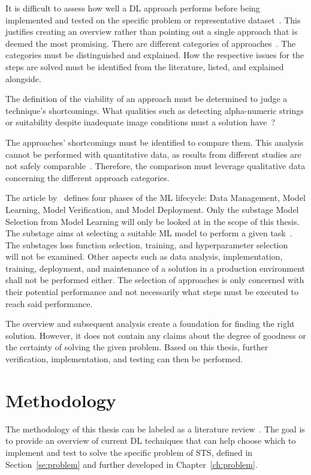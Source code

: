 It is difficult to assess how well a \ac{DL} approach performs before being implemented and tested
on the specific problem or representative dataset~\citep{arpteg_software_2018}.
This justifies creating an overview rather than pointing out a single approach that is
deemed the most promising.
There are different categories of approaches~\citep{chen_text_2021,long_scene_2021}.
The categories must be distinguished and explained.
How the respective issues for the steps are solved must be
identified from the literature, listed, and explained alongside.

The definition of the viability of an approach must be determined to judge a technique's shortcomings.
What qualities such as detecting alpha-numeric strings or suitability despite
inadequate image conditions must a solution have~\citep{ghosh_visual_2017, hu_gtc_2020}?

The approaches' shortcomings must be identified to compare them.
This analysis cannot be performed with quantitative data, as results from different studies are
not safely comparable~\citep{baek_what_2019,arpteg_software_2018,long_scene_2021}.
Therefore, the comparison must leverage qualitative data concerning the different approach
categories.

The article by~\cite{ashmore_assuring_2021} defines four phases of the \ac{ML} lifecycle:
Data Management, Model Learning, Model Verification, and Model Deployment.
Only the substage Model Selection from Model Learning will only be looked at in the scope of this
thesis.
The substage aims at selecting a suitable \ac{ML} model to perform a given
task~\citep{ashmore_assuring_2021}.
The substages loss function selection, training, and hyperparameter
selection~\citep{ashmore_assuring_2021} will not be examined.
Other aspects such as data analysis, implementation, training, deployment, and maintenance of a
solution in a production environment shall not be performed either.
The selection of approaches is only concerned with their potential performance and not
necessarily what steps must be executed to reach said performance.

The overview and subsequent analysis create a foundation for finding the right solution.
However, it does not contain any claims about the degree of goodness or the certainty of
solving the given problem.
Based on this thesis, further verification, implementation, and testing can then be performed.

\section{Methodology}\label{se:methodology}
The methodology of this thesis can be labeled as a literature review~\citep{snyder_literature_2019,
torraco_writing_2005}.
The goal is to provide an overview of current \ac{DL} techniques that can help choose
which to implement and test to solve the specific problem of \ac{STS}, defined in
Section~\ref{se:problem} and further developed in Chapter~\ref{ch:problem}.

